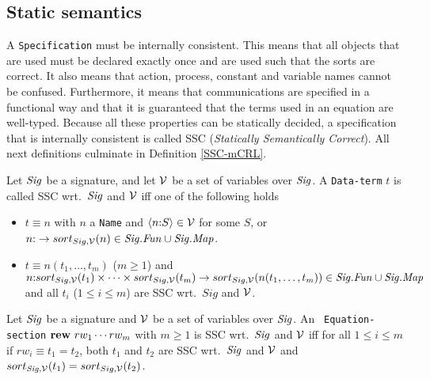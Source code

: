 \documentclass[twoside,fleqn,a4paper,dvips]{article}
\newcommand{\Sig}{\nm{Sig}}
\newcommand{\Fun}{\nm{Fun}}
\newcommand{\NV}{{\cal V}}
\begin{document}
\subsection{Static semantics}
A {\tt Specification} must be internally consistent. This means
that all objects that are used must be declared exactly once and 
are used such that the sorts are correct. It also means that action,
process, constant and variable names cannot be confused.
Furthermore, it means that communications are specified in a functional
way and that it is guaranteed that the terms used in an equation are well-typed.
Because all these properties can be statically decided, a
specification that is internally consistent is called SSC
({\em Statically Semantically Correct}). All next definitions
culminate in Definition \ref{SSC-mCRL}.

\begin{defn}
Let $\Sig$ be a signature, and let $\NV$ be a set of variables over
$\Sig$.
A {\tt Data-term} $t$ is called SSC wrt.\ $\Sig$ and $\NV$ iff one of
the following holds
\begin{itemize}
\item
$t\equiv n$ with $n$ a {\tt Name} and
$\langle n\ap S\rangle\in \NV$ for some $S$, or
$n\ap  \rightarrow sort_{Sig,\NV}(n)\in \Sig.\Fun\cup\Sig.\Map$.
\item
$t\equiv n(t_1,\ldots,t_m)$ ($m\geq 1$) and
$n\ap sort_{Sig,\NV}(t_1)\times\cdots\times sort_{Sig,\NV}(t_m)
\rightarrow sort_{Sig,\NV}(n(t_1,\ldots,t_m))\in \Sig.\Fun\cup\Sig.\Map$ and
all
$t_i$ ($1\leq i\leq m$) are SSC wrt.\ $Sig$ and $\NV$.
\end{itemize}
\end{defn}

\begin{defn}
Let $\Sig$ be a signature and $\NV$ be a set of variables over $\Sig$. An {\tt
Equation-section}
$\mathbf{rew}~rw_1\cdots rw_m$
with $m\geq 1$ is SSC wrt.\ $\Sig$ and $\NV$ iff for all
$1\leq i\leq m $ if $rw_i\equiv t_1=t_2$,
both $t_1$ and $t_2$ are SSC wrt.\ $\Sig$ and $\NV$ and
$sort_{\Sig,\NV}(t_1)=sort_{Sig,\NV}(t_2)$.
\end{defn}
\end{document}
